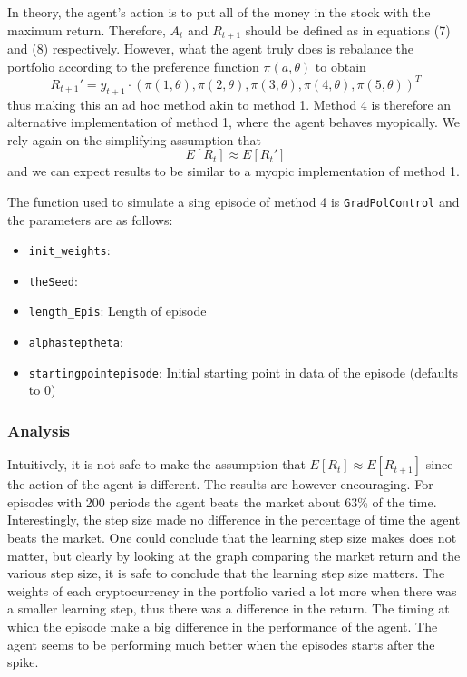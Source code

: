 \documentclass[a4paper,12pt]{article}
\newcommand{\code}[1]{\texttt{#1}}
\begin{document}
In theory, the agent's action is to put all of the money in the stock with the maximum return. Therefore, $A_t$ and $R_{t+1}$ should be defined as in equations (7) and (8) respectively. However, what the agent truly does is rebalance the portfolio according to the preference function $\pi(a,\theta)$ to obtain
\begin{equation}
R_{t+1}' = y_{t+1} \cdot (\pi(1,\theta),\pi(2,\theta),\pi(3,\theta),\pi(4,\theta),\pi(5,\theta))^T 
\end{equation}
thus making this an ad hoc method akin to method 1. Method 4 is therefore an alternative implementation of method 1, where the agent behaves myopically. We rely again on the simplifying assumption that 
$$E[R_t] \approx E[R_t']$$
and we can expect results to be similar to a myopic implementation of method 1.

The function used to simulate a sing episode of method 4 is \code{GradPolControl} and the parameters are as follows:
\begin{itemize}
  \item \code{init\_weights}: 
  \item \code{theSeed}: 
  \item \code{length\_Epis}: Length of episode
  \item \code{alphasteptheta}: 
  \item \code{startingpointepisode}: Initial starting point in data of the episode (defaults to 0)
\end{itemize}

\subsubsection{Analysis}
Intuitively, it is not safe to make the assumption that $E[R_t] \approx E[R_{t+1}]$ since the action of the agent is different. The results are however encouraging. For episodes with 200 periods the agent beats the market about 63\% of the time. Interestingly, the step size made no difference in the percentage of time the agent beats the market. One could conclude that the learning step size makes does not matter, but clearly by looking at the graph comparing the market return and the various step size, it is safe to conclude that the learning step size matters. The weights of each cryptocurrency in the portfolio varied a lot more when there was a smaller learning step, thus there was a difference in the return. The timing at which the episode make a big difference in the performance of the agent. The agent seems to be performing much better when the episodes starts after the spike. \par
\end{document}
